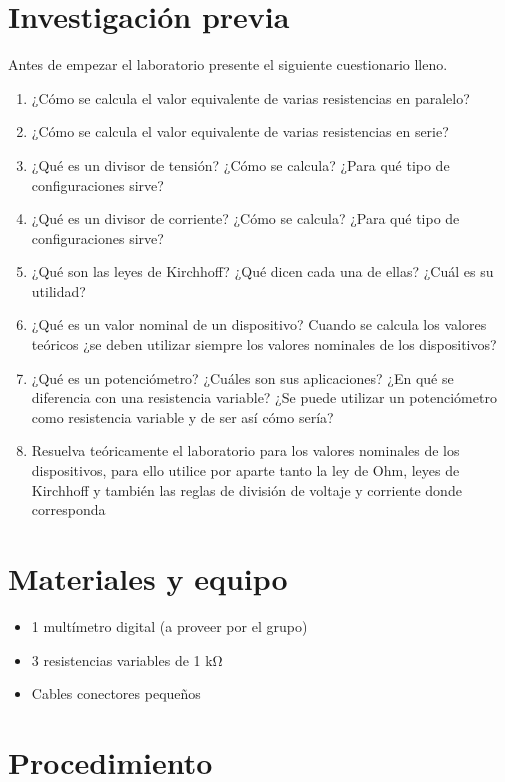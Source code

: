 \documentclass{report}
\newcommand{\inv}{Investigación previa}
\newcommand{\mat}{Materiales y equipo}
\newcommand{\pro}{Procedimiento}
\newcommand{\antesde}{Antes de empezar el laboratorio presente el siguiente cuestionario lleno.}
\begin{document}
\section{\inv}
\antesde
\begin{enumerate}
\item	¿Cómo se calcula el valor equivalente de varias resistencias en paralelo?
\item	¿Cómo se calcula el valor equivalente de varias resistencias en serie?
\item	¿Qué es un divisor de tensión? ¿Cómo se calcula? ¿Para qué tipo de configuraciones sirve?
\item	¿Qué es un divisor de corriente? ¿Cómo se calcula? ¿Para qué tipo de configuraciones sirve?
\item	¿Qué son las leyes de Kirchhoff? ¿Qué dicen cada una de ellas? ¿Cuál es su utilidad?
\item	¿Qué es un valor nominal de un dispositivo? Cuando se calcula los valores teóricos ¿se deben utilizar siempre los valores nominales de los dispositivos?
\item	¿Qué es un potenciómetro? ¿Cuáles son sus aplicaciones? ¿En qué se diferencia con una resistencia variable? ¿Se puede utilizar un potenciómetro como resistencia variable y de ser así cómo sería?
\item	Resuelva teóricamente el laboratorio para los valores nominales de los dispositivos, para ello utilice por aparte tanto la ley de Ohm, leyes de Kirchhoff y también las reglas de división de voltaje y corriente donde corresponda
\end{enumerate}

\section{\mat}
\begin{itemize}
\item	1 multímetro digital (a proveer por el grupo)
\item	3 resistencias variables de 1 k\si{\ohm}
\item	Cables conectores pequeños
\end{itemize}

\section{\pro}
\end{document}
